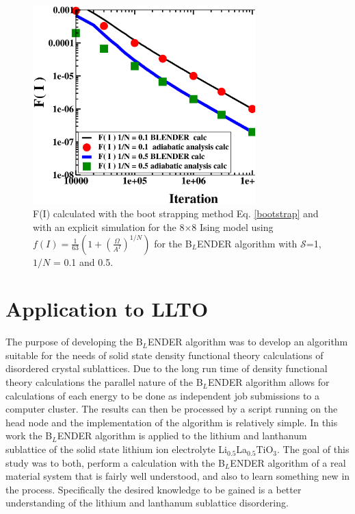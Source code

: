 \documentclass[aps,pre,reprint,superscriptaddress,showkeys]{revtex4-1}
\begin{document}
\begin{figure}
\includegraphics[width=8.6cm]{Fcalcs.eps}
\caption{F(I) calculated with the boot strapping method Eq. \ref{bootstrap} and with an explicit simulation for the 8$\times$8 Ising model using $f(I) = \frac{1}{63}(1 + (\frac{\Omega }{A^I})^{1/N})$ for the B$_L$ENDER algorithm with   $\mathcal{S}$=1, $1/N$ = 0.1  and 0.5.            \label{fcalcs}}
\end{figure}

\section{Application to LLTO}
\label{sec4}
The purpose of developing the B$_L$ENDER algorithm was to develop an algorithm suitable for the needs of solid state density functional theory calculations of disordered crystal sublattices.  Due to the long run time of density functional theory calculations  the parallel nature of the B$_L$ENDER algorithm allows for calculations of each energy to be done as independent job submissions to a computer cluster. The results can then be processed by a script running on the head node and the implementation of the algorithm is relatively simple.  In this work the B$_L$ENDER algorithm is applied to the lithium and lanthanum sublattice of the solid state lithium ion electrolyte  Li$_{0.5}$La$_{0.5}$TiO$_{3}$. The goal of this study was to both, perform a calculation with the B$_L$ENDER algorithm  of a real material system that is fairly well understood, and also to learn something new in the process.  Specifically the desired knowledge to be gained is a better understanding of the lithium and lanthanum sublattice disordering. 
\end{document}
